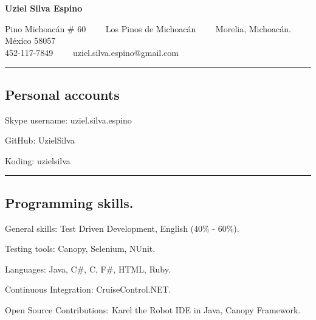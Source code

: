 \documentclass[10pt,letterpaper]{article}
\newenvironment{indentsection}[1]%
{\begin{list}{}%
	{\setlength{\leftmargin}{#1}}%
	\item[]%
}
{\end{list}}
\begin{document}
\begin{center}
{\LARGE \textbf{Uziel Silva Espino}}

Pino Michoacán \# 60\ \ \textbullet
\ \ Los Pinos de Michoacán\ \ \textbullet
\ \ Morelia, Michoacán. México 58057
\\
452-117-7849\ \ \textbullet
\ \ uziel.silva.espino@gmail.com
\end{center}

\hrule
\vspace{-0.4em}
\subsection*{Personal accounts}

\begin{indentsection}{\parindent}
\begin{description*}
	\item[Skype username:]
	uziel.silva.espino
	\item[GitHub:]
	UzielSilva
	\item[Koding:]
	uzielsilva
	
\end{description*}
\end{indentsection}

\hrule
\vspace{-0.4em}
\subsection*{Programming skills.}

\begin{indentsection}{\parindent}
\begin{description*}
	\item[General skills:]
	Test Driven Development, English (40\% - 60\%). \\
	
	\item[Testing tools:]
	Canopy,
	Selenium,
	NUnit. \\
	
	\item[Languages:]
	Java,
	C\#,
	C,
	F\#,
	HTML,
	Ruby. \\
	
	\item[Continuous Integration:]
	CruiseControl.NET. \\
	
	\item[Open Source Contributions:]
	Karel the Robot IDE in Java,
	Canopy Framework. \\
	
\end{description*}
\end{indentsection}
\end{document}
